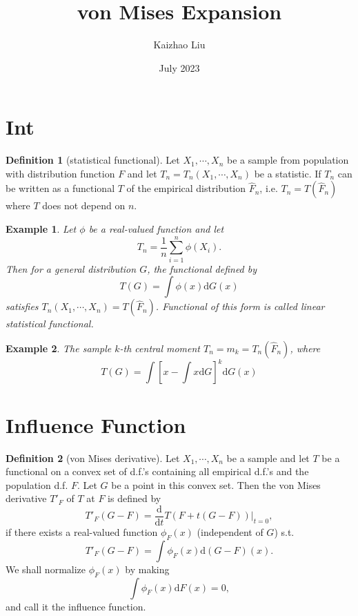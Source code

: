 \documentclass{article}
\title{von Mises Expansion}
\author{Kaizhao Liu}
\date{July 2023}
\newtheorem{example}{Example}[section]
\theoremstyle{definition}
\newtheorem{definition}{Definition}[section]
\begin{document}
\maketitle
\tableofcontents

\section{Int}

\begin{definition}[statistical functional]
    Let $X_1,\cdots,X_n$ be a sample from population with distribution function $F$ and let $T_n=T_n(X_1,\cdots,X_n)$ be a 
    statistic. If $T_n$ can be written as a functional $T$ of the empirical distribution $\hat{F}_n$, i.e. $T_n=T(\hat{F}_n)$ where $T$
    does not depend on $n$.
\end{definition}

\begin{example}
    Let $\phi$ be a real-valued function and let 
    \[ T_n=\frac{1}{n}\sum_{i=1}^{n}\phi(X_i).\] 
    Then for a general distribution $G$, the functional defined by 
    \[ T(G)=\int \phi(x) \mathrm{d}G(x) \] 
    satisfies $T_n(X_1,\cdots,X_n)=T(\hat{F}_n)$. Functional of this form is called linear statistical functional.
\end{example}

\begin{example}
    The sample $k$-th central moment $T_n=m_k=T_n(\hat{F}_n)$, where 
    \[ T(G)=\int [x-\int x\mathrm{d}G]^k \mathrm{d}G(x)\]
\end{example}

\section{Influence Function}
\begin{definition}[von Mises derivative]
    Let $X_1,\cdots,X_n$ be a sample and let $T$ be a functional on a convex set of d.f.'s containing all empirical d.f.'s and the population d.f. $F$.
    Let $G$ be a point in this convex set. Then the von Mises derivative $T'_F$ of $T$ at $F$ is defined by 
    \[ T'_F(G-F)=\frac{\mathrm{d}}{\mathrm{d}t} T(F+t(G-F))|_{t=0},\]
    if there exists a real-valued function $\phi_F(x)$ (independent of $G$) s.t. 
    \[ T'_F(G-F)=\int \phi_F(x)\mathrm{d}(G-F)(x).\] 
    We shall normalize $\phi_F(x)$ by making 
    \[\int \phi_F(x)\mathrm{d}F (x)=0 ,\]
    and call it the influence function.
\end{definition}
\end{document}
